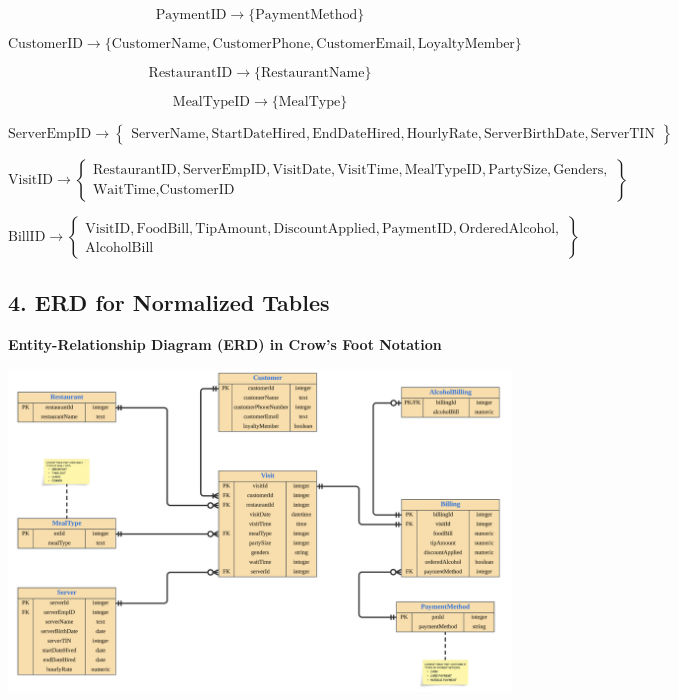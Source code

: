 \documentclass[
]{article}
\begin{document}
\[
\text{PaymentID} \rightarrow \{\text{PaymentMethod}\}
\]

\[
\text{CustomerID} \rightarrow \{\text{CustomerName}, \text{CustomerPhone}, \text{CustomerEmail}, \text{LoyaltyMember}\}
\]

\[
\text{RestaurantID} \rightarrow \{\text{RestaurantName}\}
\]

\[
\text{MealTypeID} \rightarrow \{\text{MealType}\}
\]

\[
\text{ServerEmpID} \rightarrow 
\left\{
\begin{array}{l}
\text{ServerName}, \text{StartDateHired}, \text{EndDateHired}, \text{HourlyRate}, \text{ServerBirthDate}, \text{ServerTIN}
\end{array}
\right\}
\]

\[
\text{VisitID} \rightarrow 
\left\{
\begin{array}{l}
\text{RestaurantID}, \text{ServerEmpID}, \text{VisitDate}, \text{VisitTime}, \text{MealTypeID}, \text{PartySize}, \text{Genders}, \\
\text{WaitTime}, \text{CustomerID}
\end{array}
\right\}
\]

\[
\text{BillID} \rightarrow 
\left\{
\begin{array}{l}
\text{VisitID}, \text{FoodBill}, \text{TipAmount}, \text{DiscountApplied}, \text{PaymentID}, \text{OrderedAlcohol}, \\
\text{AlcoholBill}
\end{array}
\right\}
\]

\subsection{\texorpdfstring{\textbf{4. ERD for Normalized
Tables}}{4. ERD for Normalized Tables}}\label{erd-for-normalized-tables}

\textbf{Entity-Relationship Diagram (ERD) in Crow's Foot Notation}

\includegraphics{ERD.png}
\end{document}
